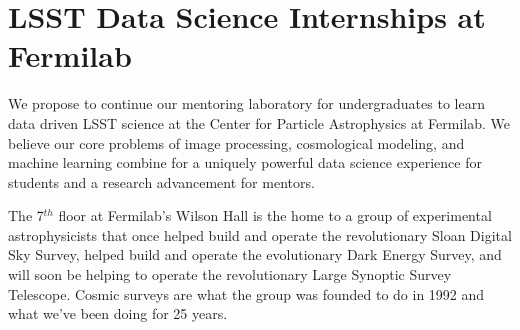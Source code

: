 
\section{LSST Data Science Internships at Fermilab}


 
We propose to continue our mentoring laboratory for undergraduates to
learn data driven LSST science at the Center for Particle
Astrophysics at Fermilab. We believe our core problems of image processing,
cosmological modeling, and machine learning combine for a uniquely powerful
data science experience for students and a research advancement for mentors.


The 7$^{th}$ floor at Fermilab's Wilson Hall is the home to a 
group of experimental astrophysicists that once helped build and operate
the revolutionary Sloan Digital Sky Survey, helped build and operate
the evolutionary Dark Energy Survey, and will soon be helping to operate 
the revolutionary Large Synoptic Survey Telescope. Cosmic surveys are
what the group was founded to do in 1992 and what we've been doing for 25 years.


